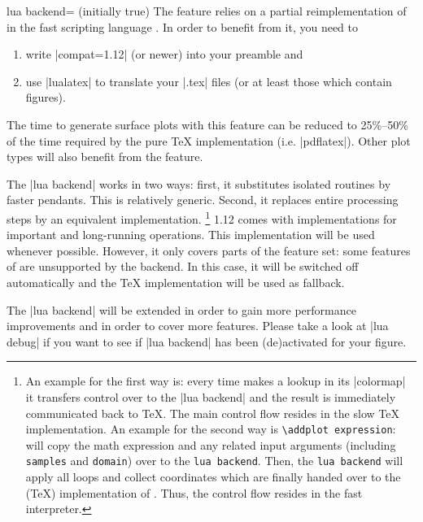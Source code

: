 {\begin{pgfplotskey}{lua backend= (initially true)}
    The feature relies on a partial reimplementation of \PGFPlots{} in the fast
    scripting language \lua. In order to benefit from it, you need to
    \begin{enumerate}
        \item write |compat=1.12| (or newer) into your preamble and
        \item use |lualatex| to translate your |.tex| files (or at least
            those which contain \PGFPlots{} figures).
    \end{enumerate}

    The time to generate surface plots with this feature can be reduced to
    25\%--50\% of the time required by the pure \TeX{} implementation (i.e.\@
    |pdflatex|). Other plot types will also benefit from the feature.

    The |lua backend| works in two ways: first, it substitutes isolated
    routines by faster \lua{} pendants. This is relatively generic. Second, it
    replaces entire processing steps by an equivalent \lua{} implementation.%
    \footnote{
        An example for the first way is: every time \PGFPlots{} makes a lookup
        in its |colormap| it transfers control over to the |lua backend| and
        the result is immediately communicated back to \TeX{}. The main control
        flow resides in the slow \TeX{} implementation. An example for the
        second way is \texttt{\textbackslash addplot expression}: \PGFPlots{}
        will copy the math expression and any related input arguments
        (including \texttt{samples} and \texttt{domain}) over to the
        \texttt{lua backend}. Then, the \texttt{lua backend} will apply all
        loops and collect coordinates which are finally handed over to the
        (\TeX{}) implementation of \pgfname{}. Thus, the control flow resides
        in the fast \lua{} interpreter.
    }
    \PGFPlots{} 1.12 comes with \lua{} implementations for important and
    long-running operations. This implementation will be used whenever
    possible. However, it only covers parts of the feature set: some features
    of \PGFPlots{} are unsupported by the \lua{} backend. In this case, it will
    be switched off automatically and the \TeX{} implementation will be used as
    fallback.

    The |lua backend| will be extended in order to gain more performance
    improvements and in order to cover more features. Please take a look at
    |lua debug| if you want to see if |lua backend| has been (de)activated for
    your figure.


\end{pgfplotskey}}
